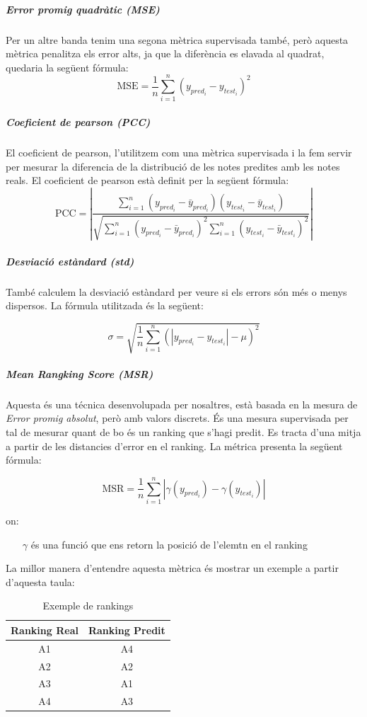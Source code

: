 \documentclass[12pt,a4paper,catalan]{article}
\begin{document}
\subparagraph{Error promig quadràtic (MSE)}
Per un altre banda tenim una segona mètrica supervisada també, però aquesta mètrica penalitza els error alts, ja que la diferència es elavada al quadrat, quedaria la següent fórmula:
$$\mathrm{MSE}=\frac{1}{n}\sum_{i=1}^n(y_{pred_i}-y_{test_i})^2$$

\subparagraph{Coeficient de pearson (PCC)}
El coeficient de pearson, l'utilitzem com una mètrica supervisada i la fem servir per mesurar la diferencia de la distribució de les notes predites amb les notes reals. El coeficient de pearson està definit per la següent fórmula:
$$\mathrm{PCC} =\left| \frac{\sum_{i=1}^n(y_{pred_i} - \bar{y}_{pred_i})(y_{test_i} - \bar{y}_{test_i})}{\sqrt{\sum_{i=1}^n(y_{pred_i} - \bar{y}_{pred_i})^2  \sum_{i=1}^n(y_{test_i} - \bar{y}_{test_i})^2}}\right|$$

\subparagraph{Desviació estàndard (std)}
També calculem la desviació estàndard per veure si els errors són més o menys dispersos. La fórmula utilitzada és la següent:

$$ \sigma = \sqrt{ \frac{1}{n} \sum_{i=1}^n (\left| y_{pred_i}-y_{test_i}\right| - \mu)^2 } $$

\subparagraph{\textit{Mean Rangking Score (MSR)}}
Aquesta és una técnica desenvolupada per nosaltres, està basada en la mesura de \textit{Error promig absolut}, però amb valors discrets. És una mesura supervisada per tal de mesurar quant de bo és un ranking que s'hagi predit. Es tracta d'una mitja a partir de les distancies d'error en el ranking. La métrica presenta la següent fórmula:

$$ \mathrm{MSR} = \frac{1}{n}\sum_{i=1}^n \left| \gamma(y_{pred_i}) -  \gamma(y_{test_i})\right| $$

on:
\begin{itemize}[leftmargin=.5in]
	\item [$\gamma$] és una funció que ens retorn la posició de l'elemtn en el ranking
\end{itemize}

\newpage

La millor manera d'entendre aquesta mètrica és mostrar un exemple a partir d'aquesta taula:

\begin{table}[h]
\centering
\label{my-label}
\begin{tabular}{@{}cc@{}}
\toprule
Ranking Real & Ranking Predit \\ \midrule
A1           & A4             \\
A2           & A2             \\
A3           & A1             \\
A4           & A3             \\ \bottomrule
\end{tabular}
\caption{Exemple de rankings}
\end{table}
\end{document}
